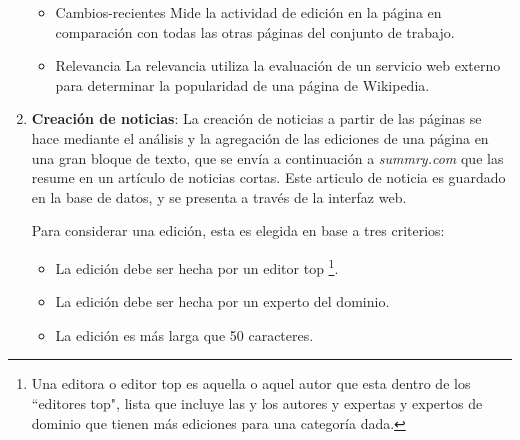 \begin{enumerate}
\begin{itemize}
		\item Cambios-recientes
		Mide la actividad de edición en la página en comparación con todas las otras páginas del conjunto de trabajo.
		
		\item Relevancia
		La relevancia utiliza la evaluación de un servicio web externo para determinar la popularidad de una página de Wikipedia.	
		
	\end{itemize}
	\item \textbf{Creación de noticias}:
	La creación de noticias a partir de las páginas se hace mediante el análisis y la agregación de las ediciones de una página en una gran bloque de texto, que se envía a continuación a \emph{summry.com} que las resume en un artículo de noticias cortas. Este articulo de noticia es guardado en la base de datos, y se presenta a través de la interfaz web.
	
	Para considerar una edición, esta es elegida en base a tres criterios:
	\begin{itemize}
		\item La edición debe ser hecha por un editor top \footnote{Una editora o editor top es aquella o aquel autor que esta dentro de los ``editores top", lista que incluye las y los autores y expertas y expertos de dominio que tienen más ediciones para una categoría dada.}.
		\item La edición debe ser hecha por un experto del dominio.
		\item La edición es más larga que 50 caracteres.
	\end{itemize}
	
\end{enumerate}


